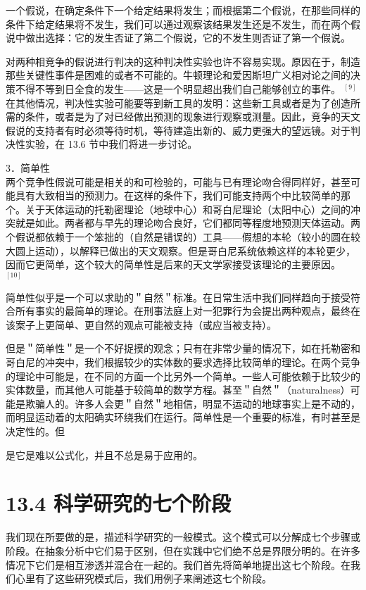 一个假说，在确定条件下一个给定结果将发生；而根据第二个假说，在那些同样的条件下给定结果将不发生，我们可以通过观察该结果发生还是不发生，而在两个假说中做出选择：它的发生否证了第二个假说，它的不发生则否证了第一个假说。

对两种相竞争的假说进行判决的这种判决性实验也许不容易实现。原因在于，制造那些关键性事件是困难的或者不可能的。牛顿理论和爱因斯坦广义相对论之间的决策不得不等到日全食的发生——这是一个明显超出我们自己能够创立的事件。 ${ }^{[9]}$ 在其他情况，判决性实验可能要等到新工具的发明：这些新工具或者是为了创造所需的条件，或者是为了对已经做出预测的现象进行观察或测量。因此，竞争的天文假说的支持者有时必须等待时机，等待建造出新的、威力更强大的望远镜。对于判决性实验，在 13.6 节中我们将进一步讨论。

3．简单性\\
两个竞争性假说可能是相关的和可检验的，可能与已有理论吻合得同样好，甚至可能具有大致相当的预测力。在这样的条件下，我们可能支持两个中比较简单的那个。关于天体运动的托勒密理论（地球中心）和哥白尼理论（太阳中心）之间的冲突就是如此。两者都与早先的理论吻合良好，它们都同等程度地预测天体运动。两个假说都依赖于一个笨拙的（自然是错误的）工具——假想的本轮（较小的圆在较大圆上运动），以解释已做出的天文观察。但是哥白尼系统依赖这样的本轮更少，因而它更简单，这个较大的简单性是后来的天文学家接受该理论的主要原因。 ${ }^{[10]}$

简单性似乎是一个可以求助的＂自然＂标准。在日常生活中我们同样趋向于接受符合所有事实的最简单的理论。在刑事法庭上对一犯罪行为会提出两种观点，最终在该案子上更简单、更自然的观点可能被支持（或应当被支持）。

但是＂简单性＂是一个不好捉摸的观念；只有在非常少量的情况下，如在托勒密和哥白尼的冲突中，我们根据较少的实体数的要求选择比较简单的理论。在两个竞争的理论中可能是，在不同的方面一个比另外一个简单。一些人可能依赖于比较少的实体数量，而其他人可能基于较简单的数学方程。甚至＂自然＂（naturalness）可能是欺骗人的。许多人会更＂自然＂地相信，明显不运动的地球事实上是不动的，而明显运动着的太阳确实环绕我们在运行。简单性是一个重要的标准，有时甚至是决定性的。但

是它是难以公式化，并且不总是易于应用的。

\section*{13.4 科学研究的七个阶段}
我们现在所要做的是，描述科学研究的一般模式。这个模式可以分解成七个步骤或阶段。在抽象分析中它们易于区别，但在实践中它们绝不总是界限分明的。在许多情况下它们是相互渗透并混合在一起的。我们首先将简单地提出这七个阶段。在我们心里有了这些研究模式后，我们用例子来阐述这七个阶段。

